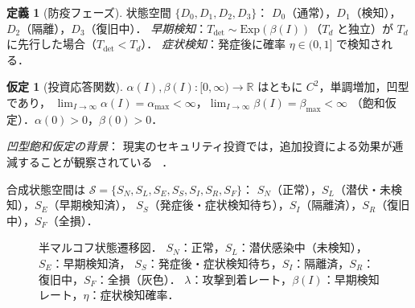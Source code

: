 \documentclass[12pt,a4paper]{article}
\theoremstyle{plain}
\theoremstyle{definition}
\newtheorem{definition}[theorem]{定義}
\newtheorem{assumption}[theorem]{仮定}
\theoremstyle{remark}
\newcommand{\Tdet}{T_{\mathrm{det}}}
\newcommand{\betaI}{\beta(I)}
\newcommand{\alphI}{\alpha(I)}
\begin{document}
\begin{definition}[防疫フェーズ]\label{def:defense}
状態空間 $\{D_0,D_1,D_2,D_3\}$：
$D_0$（通常），$D_1$（検知），$D_2$（隔離），$D_3$（復旧中）．
\emph{早期検知}：$\Tdet\sim\mathrm{Exp}(\betaI)$（$T_d$ と独立）が $T_d$ に先行した場合（$\Tdet<T_d$）．
\emph{症状検知}：発症後に確率 $\eta\in(0,1]$ で検知される．
\end{definition}

\begin{assumption}[投資応答関数]\label{ass:invest}
$\alphI,\betaI:[0,\infty)\to\mathbb{R}$ はともに $C^2$，単調増加，凹型であり，
$\lim_{I\to\infty}\alphI=\alpha_{\max}<\infty$，$\lim_{I\to\infty}\betaI=\beta_{\max}<\infty$
（飽和仮定）．$\alpha(0)>0$，$\beta(0)>0$．

\emph{凹型飽和仮定の背景}：
現実のセキュリティ投資では，追加投資による効果が逓減することが観察されている
~\cite{gordon2002,hausken2006,anderson2020}．
\end{assumption}

合成状態空間は $\mathcal{S}=\{S_N,S_L,S_E,S_S,S_I,S_R,S_F\}$：
$S_N$（正常），$S_L$（潜伏・未検知），$S_E$（早期検知済），
$S_S$（発症後・症状検知待ち），$S_I$（隔離済），$S_R$（復旧中），$S_F$（全損）．

\begin{figure}[H]
\centering
{}
\caption{半マルコフ状態遷移図．
$S_N$：正常，$S_L$：潜伏感染中（未検知），$S_E$：早期検知済，
$S_S$：発症後・症状検知待ち，$S_I$：隔離済，$S_R$：復旧中，$S_F$：全損（灰色）．
$\lambda$：攻撃到着レート，$\beta(I)$：早期検知レート，$\eta$：症状検知確率．}
\label{fig:statemachine}
\end{figure}
\end{document}
